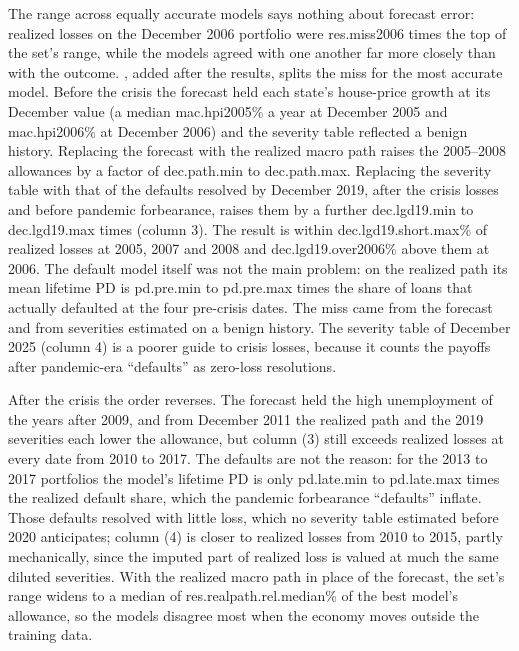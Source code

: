 The range across equally accurate models says nothing about forecast error:
realized losses on the December 2006 portfolio were \num{res.miss2006} times
the top of the set's range, while the models agreed with one another far more
closely than with the outcome. , added after the results,
splits the miss for the most accurate model. Before the crisis the forecast
held each state's house-price growth at its December value (a median
\num{mac.hpi2005}\% a year at December 2005 and \num{mac.hpi2006}\% at December
2006) and the severity table reflected a benign history. Replacing the
forecast with the realized macro path raises the 2005--2008 allowances by a
factor of \num{dec.path.min} to \num{dec.path.max}. Replacing the severity
table with that of the defaults resolved by December 2019, after the crisis
losses and before pandemic forbearance, raises them by a further
\num{dec.lgd19.min} to \num{dec.lgd19.max} times (column 3). The result is
within \num{dec.lgd19.short.max}\% of realized losses at 2005, 2007 and 2008
and \num{dec.lgd19.over2006}\% above them at 2006. The default model itself was
not the main problem: on the realized path its mean lifetime PD is
\num{pd.pre.min} to \num{pd.pre.max} times the share of loans that actually
defaulted at the four pre-crisis dates. The miss came from the forecast and
from severities estimated on a benign history. The severity table of December
2025 (column 4) is a poorer guide to crisis losses, because it counts the
payoffs after pandemic-era ``defaults'' as zero-loss resolutions.

After the crisis the order reverses. The forecast held the high unemployment
of the years after 2009, and from December 2011 the realized path and the
2019 severities each lower the allowance, but column (3) still exceeds
realized losses at every date from 2010 to 2017. The defaults are not the
reason: for the 2013 to 2017 portfolios the model's lifetime PD is only
\num{pd.late.min} to \num{pd.late.max} times the realized default share, which
the pandemic forbearance ``defaults'' inflate. Those defaults resolved with
little loss, which no severity table estimated before 2020 anticipates;
column (4) is closer to realized losses from 2010 to 2015, partly mechanically, since the
imputed part of realized loss is valued at much the same diluted severities.
With the realized macro path
in place of the forecast, the set's range widens to a median of
\num{res.realpath.rel.median}\% of the best model's allowance, so the models
disagree most when the economy moves outside the training data.

